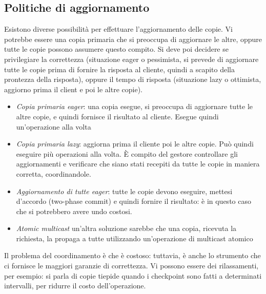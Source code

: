 \subsection{Politiche di aggiornamento}
Esistono diverse possibilità per effettuare l'aggiornamento delle copie. Vi 
potrebbe essere una copia primaria che si
preoccupa di aggiornare le altre, oppure tutte le copie possono assumere questo 
compito. Si deve poi decidere se
privilegiare la correttezza (situazione eager o pessimista, si prevede di 
aggiornare tutte le copie prima di fornire
la risposta al cliente, quindi a scapito della prontezza della risposta), 
oppure il tempo di risposta (situazione
lazy o ottimista, aggiorno prima il client e poi le altre copie).
\begin{itemize}
 \item \textit{Copia primaria eager}: una copia esegue, si preoccupa di 
aggiornare tutte le altre copie, e quindi
 fornisce il risultato al cliente. Esegue quindi un'operazione alla volta
 \item \textit{Copia primaria lazy}: aggiorna prima il cliente poi le altre 
copie. Può quindi eseguire più operazioni
 alla volta. È compito del gestore controllare gli aggiornamenti e verificare 
che siano stati recepiti da tutte le copie
 in maniera corretta, coordinandole.
 \item \textit{Aggiornamento di tutte eager}: tutte le copie devono eseguire, 
mettesi d'accordo (two-phase commit) e
 quindi fornire il risultato: è in questo caso che si potrebbero avere undo
 costosi.
 \item \textit{Atomic multicast} un'altra soluzione sarebbe che una copia,
 ricevuta la richiesta, la propaga a tutte utilizzando un'operazione di
 multicast atomico
\end{itemize}
Il problema del coordinamento è che è costoso: tuttavia, è anche lo strumento 
che ci fornisce le maggiori garanzie di
correttezza. Vi possono essere dei rilassamenti, per esempio: si parla di copie 
tiepide quando i checkpoint sono fatti
a determinati intervalli, per ridurre il costo dell'operazione.
